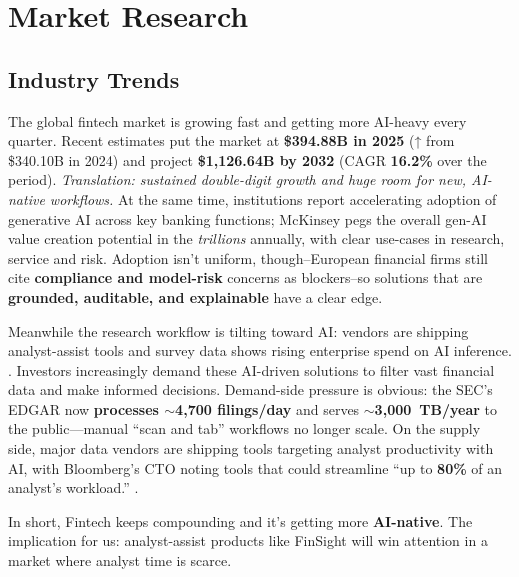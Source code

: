 \chapter{Market Research}

\section{Industry Trends}

The global fintech market is growing fast and getting more AI-heavy every quarter. Recent estimates put the market at \textbf{\$394.88B in 2025} (↑ from \$340.10B in 2024) and project \textbf{\$1{,}126.64B by 2032} (CAGR \textbf{16.2\%} over the period). \textit{Translation: sustained double-digit growth and huge room for new, AI-native workflows.} \parencite{fbi_fintech_2025} At the same time, institutions report accelerating adoption of generative \acs{AI} across key banking functions; McKinsey pegs the overall gen-\acs{AI} value creation potential in the \emph{trillions} annually, with clear use-cases in research, service and risk. \parencite{mck_genai_banking,mck_state_ai_2023} Adoption isn’t uniform, though--European financial firms still cite \textbf{compliance and model-risk} concerns as blockers--so solutions that are \textbf{grounded, auditable, and explainable} have a clear edge. \parencite{ft_ai_hurdles_2024}

Meanwhile the research workflow is tilting toward \acf{AI}: vendors are shipping analyst-assist tools and survey data shows rising enterprise spend on AI inference. \parencite{bloomberg_bi_ai_spend_2024,bloomberg_doc_insights_2025}. Investors increasingly demand these AI-driven solutions to filter vast financial data and make informed decisions. Demand-side pressure is obvious: the SEC’s \acs{EDGAR} now \textbf{processes \(\sim\)4{,}700 filings/day} and serves \textbf{\(\sim\)3{,}000~TB/year} to the public—manual “scan and tab” workflows no longer scale. \parencite{sec_about_edgar_2024} On the supply side, major data vendors are shipping tools targeting analyst productivity with \acs{AI}, with Bloomberg’s CTO noting tools that could streamline “up to \textbf{80\%} of an analyst’s workload.” \parencite{fbi_fintech_2025,fnl_bbg_analyst_80_2025}.

In short, Fintech keeps compounding and it’s getting more \textbf{AI-native}. The implication for us: analyst-assist products like FinSight will win attention in a market where analyst time is scarce.

